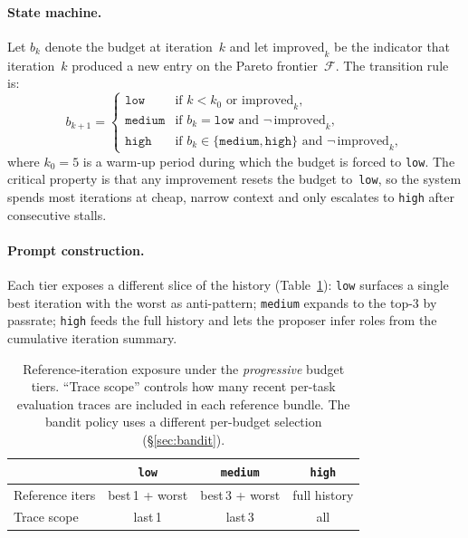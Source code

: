 \paragraph{State machine.}
Let $b_k$ denote the budget at iteration~$k$ and let
$\mathrm{improved}_k$ be the indicator that iteration~$k$ produced a new
entry on the Pareto frontier~$\mathcal{F}$. The transition rule is:
\begin{equation}
  b_{k+1} =
  \begin{cases}
    \texttt{low}    & \text{if } k < k_0 \text{ or } \mathrm{improved}_k, \\
    \texttt{medium} & \text{if } b_k = \texttt{low}
                      \text{ and } \neg\,\mathrm{improved}_k, \\
    \texttt{high}   & \text{if } b_k \in \{\texttt{medium},\texttt{high}\}
                      \text{ and } \neg\,\mathrm{improved}_k,
  \end{cases}
  \label{eq:progressive}
\end{equation}
where $k_0\!=\!5$ is a warm-up period during which the budget is forced
to \texttt{low}. The critical property is that any improvement
resets the budget to~\texttt{low}, so the system spends most iterations
at cheap, narrow context and only escalates to \texttt{high} after
consecutive stalls.

\paragraph{Prompt construction.}
Each tier exposes a different slice of the history
(Table~\ref{tab:budgets}): \texttt{low} surfaces a single best
iteration with the worst as anti-pattern; \texttt{medium} expands to
the top-3 by passrate; \texttt{high} feeds the full history and lets
the proposer infer roles from the cumulative iteration summary.

\begin{table}[h]
\centering
\small
\begin{tabular}{@{}lccc@{}}
\toprule
 & \texttt{low} & \texttt{medium} & \texttt{high} \\
\midrule
Reference iters & best\,1 + worst & best\,3 + worst & full history \\
Trace scope & last\,1 & last\,3 & all \\
\bottomrule
\end{tabular}
\vspace{2pt}
\caption{Reference-iteration exposure under the \emph{progressive}
budget tiers. ``Trace scope'' controls how many recent per-task
evaluation traces are included in each reference bundle. The bandit
policy uses a different per-budget selection
(\S\ref{sec:bandit}).}
\label{tab:budgets}
\end{table}

